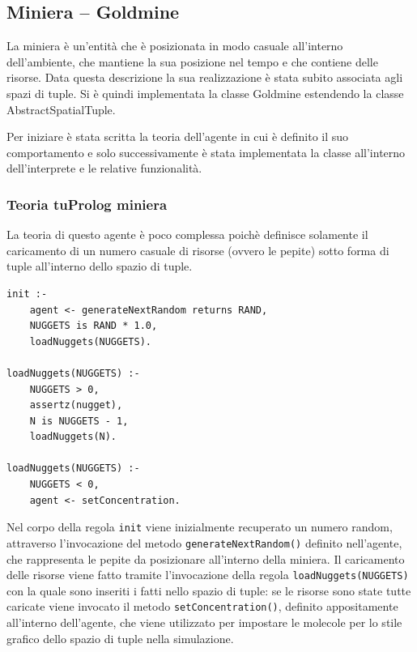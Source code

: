 \subsection{Miniera -- Goldmine}
La miniera è un'entità che è posizionata in modo casuale all'interno dell'ambiente, che mantiene la sua posizione nel tempo e che contiene delle risorse.
Data questa descrizione la sua realizzazione è stata subito associata agli spazi di tuple. Si è quindi implementata la classe Goldmine estendendo la classe AbstractSpatialTuple.

Per iniziare è stata scritta la teoria dell'agente in cui è definito il suo comportamento e solo successivamente è stata implementata la classe all'interno dell'interprete e le relative funzionalità.

\subsubsection{Teoria tuProlog miniera}
La teoria di questo agente è poco complessa poichè definisce solamente il caricamento di un numero casuale di risorse (ovvero le pepite) sotto forma di tuple all'interno dello spazio di tuple.

\switchToProlog{}
\begin{lstlisting}[float,firstnumber=1,label={lst:Goldmine},caption={Teoria miniera}]
init :-
    agent <- generateNextRandom returns RAND,
    NUGGETS is RAND * 1.0,
    loadNuggets(NUGGETS).

loadNuggets(NUGGETS) :-
    NUGGETS > 0,
    assertz(nugget),
    N is NUGGETS - 1,
    loadNuggets(N).

loadNuggets(NUGGETS) :-
    NUGGETS < 0,
    agent <- setConcentration.
\end{lstlisting}

Nel corpo della regola \texttt{init} viene inizialmente recuperato un numero random, attraverso l'invocazione del metodo \texttt{generateNextRandom()} definito nell'agente, che rappresenta le pepite da posizionare all'interno della miniera.
Il caricamento delle risorse viene fatto tramite l'invocazione della regola \texttt{loadNuggets(NUGGETS)} con la quale sono inseriti i fatti nello spazio di tuple: se le risorse sono state tutte caricate viene invocato il metodo \texttt{setConcentration()}, definito appositamente all'interno dell'agente, che viene utilizzato per impostare le molecole per lo stile grafico dello spazio di tuple nella simulazione.

